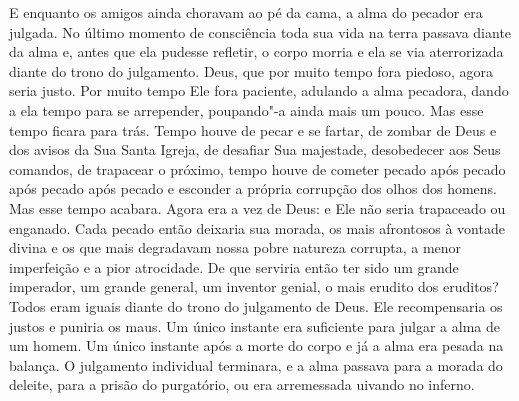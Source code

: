 E enquanto os amigos ainda choravam ao pé da cama, a alma do pecador era
julgada. No último momento de consciência toda sua vida na terra
passava diante da alma e, antes que ela pudesse refletir, o corpo
morria e ela se via aterrorizada diante do trono do julgamento. Deus,
que por muito tempo fora piedoso, agora seria justo. Por muito tempo
Ele fora paciente, adulando a alma pecadora, dando a ela tempo para se
arrepender, poupando"-a ainda mais um pouco. Mas esse tempo ficara para
trás. Tempo houve de pecar e se fartar, de zombar de Deus e dos avisos
da Sua Santa Igreja, de desafiar Sua majestade, desobedecer aos Seus
comandos, de trapacear o próximo, tempo houve de cometer pecado após
pecado após pecado após pecado e esconder a própria corrupção dos olhos
dos homens. Mas esse tempo acabara. Agora era a vez de Deus: e Ele não
seria trapaceado ou enganado. Cada pecado então deixaria sua 
morada, os mais afrontosos à vontade divina e os que mais degradavam
nossa pobre natureza corrupta, a menor imperfeição e a pior atrocidade.
De que serviria então ter sido um grande imperador, um grande general,
um inventor genial, o mais erudito dos eruditos? Todos eram iguais
diante do trono do julgamento de Deus. Ele recompensaria os justos e
puniria os maus. Um único instante era suficiente para julgar a alma de
um homem. Um único instante após a morte do corpo e já a alma era
pesada na balança. O julgamento individual terminara, e a alma passava
para a morada do deleite, para a prisão do purgatório, ou era
arremessada uivando no inferno.

